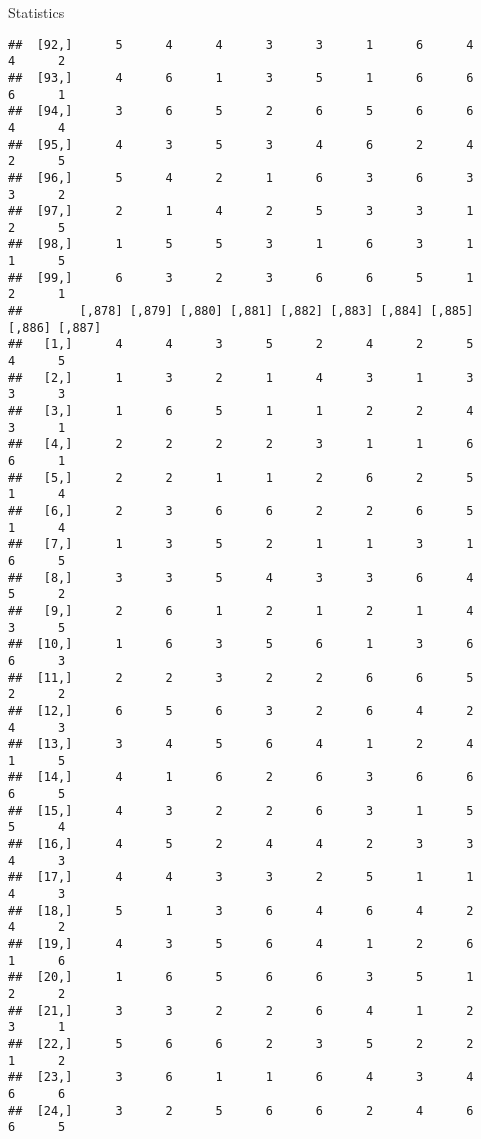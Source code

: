 \documentclass[
  ignorenonframetext,
]{beamer}
\begin{document}
\begin{frame}[fragile]{Statistics}
\begin{verbatim}
##  [92,]      5      4      4      3      3      1      6      4      4      2
##  [93,]      4      6      1      3      5      1      6      6      6      1
##  [94,]      3      6      5      2      6      5      6      6      4      4
##  [95,]      4      3      5      3      4      6      2      4      2      5
##  [96,]      5      4      2      1      6      3      6      3      3      2
##  [97,]      2      1      4      2      5      3      3      1      2      5
##  [98,]      1      5      5      3      1      6      3      1      1      5
##  [99,]      6      3      2      3      6      6      5      1      2      1
##        [,878] [,879] [,880] [,881] [,882] [,883] [,884] [,885] [,886] [,887]
##   [1,]      4      4      3      5      2      4      2      5      4      5
##   [2,]      1      3      2      1      4      3      1      3      3      3
##   [3,]      1      6      5      1      1      2      2      4      3      1
##   [4,]      2      2      2      2      3      1      1      6      6      1
##   [5,]      2      2      1      1      2      6      2      5      1      4
##   [6,]      2      3      6      6      2      2      6      5      1      4
##   [7,]      1      3      5      2      1      1      3      1      6      5
##   [8,]      3      3      5      4      3      3      6      4      5      2
##   [9,]      2      6      1      2      1      2      1      4      3      5
##  [10,]      1      6      3      5      6      1      3      6      6      3
##  [11,]      2      2      3      2      2      6      6      5      2      2
##  [12,]      6      5      6      3      2      6      4      2      4      3
##  [13,]      3      4      5      6      4      1      2      4      1      5
##  [14,]      4      1      6      2      6      3      6      6      6      5
##  [15,]      4      3      2      2      6      3      1      5      5      4
##  [16,]      4      5      2      4      4      2      3      3      4      3
##  [17,]      4      4      3      3      2      5      1      1      4      3
##  [18,]      5      1      3      6      4      6      4      2      4      2
##  [19,]      4      3      5      6      4      1      2      6      1      6
##  [20,]      1      6      5      6      6      3      5      1      2      2
##  [21,]      3      3      2      2      6      4      1      2      3      1
##  [22,]      5      6      6      2      3      5      2      2      1      2
##  [23,]      3      6      1      1      6      4      3      4      6      6
##  [24,]      3      2      5      6      6      2      4      6      6      5

\end{verbatim}
\end{frame}
\end{document}
